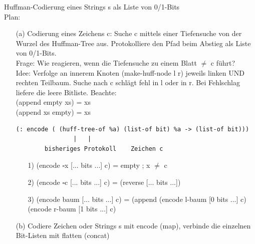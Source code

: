 \documentclass[a4paper, 20pt, openany]{book}
\begin{document}
Huffman-Codierung eines Strings s als Liste von 0/1-Bits\\
Plan:\\
\begin{enumerate}
\item[(a)] Codierung eines Zeichens c:
Suche c mittels einer Tiefensuche von der Wurzel des Huffman-Tree aus. Protokolliere den Pfad beim Abstieg als Liste von 0/1-Bits.\\
Frage: Wie reagieren, wenn die Tiefensuche zu einem Blatt $\ne$ c führt?\\
Idee: Verfolge an innerem Knoten (make-huff-node l r) jeweils linken UND rechten Teilbaum. Suche nach c schlägt fehl in l oder in r. Bei Fehlschlag liefere die leere Bitliste. Beachte:\\
(append empty xs) = xs\\
(append xs empty) = xs\\


\begin{lstlisting}
(: encode ( (huff-tree-of %a) (list-of bit) %a -> (list-of bit)))
				| 	|
		bisheriges Protokoll    Zeichen c
\end{lstlisting}

\begin{enumerate}
\item[1)] (encode $\square$x [... bits ...] c) = empty  ; x $\ne$ c
\item[2)] (encode $\square$c [... bits ...] c) = (reverse  [... bits ...])
\item[3)] (encode baum [... bits ...] c) = (append (encode l-baum [0 bits ...] c) (encode r-baum [1 bits ...] c)
\end{enumerate}

\item[(b)] Codiere Zeichen oder Strings s mit encode (map), verbinde die einzelnen Bit-Listen mit flatten (concat)

\end{enumerate}
\end{document}
